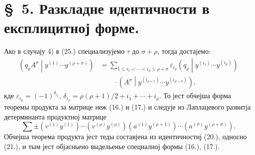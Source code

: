 ﻿\documentclass[11pt]{article}
\newcommand{\pair}[2]{\left(#1\middle|#2\right)}
\newcommand{\eps}{\varepsilon}
\begin{document}
\section*{\S\ 5. Разкладне идентичности в експлицитној форме.}

Ако в случају 4) в (25.) специализујемо $\tau$ до $\sigma+\rho$, тогда достајемо:
\begin{equation}
\begin{aligned}
 \pair{q_\rho A^\sigma}{y^{(1)}\cdots y^{(\rho+\sigma)}}
 &=\sum_{1\le i_1<\cdots<i_\rho\le \rho+\sigma}
 \eps_{i_\rho}\pair{q_\rho}{y^{(i_1)}\cdots y^{(i_\rho)}}\\
 &\qquad\cdot
 \pair{A^\sigma}{y^{(i_{\rho+1})}\cdots y^{(i_{\rho+\sigma})}},
\end{aligned}
\tag{32}
\end{equation}
кде $\eps_{i_\rho}=(-1)^{\delta_{i_\rho}}$, $\delta_{i_\rho}=\rho(\rho+1)/2+i_1+\cdots+i_\rho$. То јест обчејша форма теоремы продукта за матрице неж (16.) и (17.) и следује из Лаплацевого развитја детерминанта продуктној матрице
\[
 \sum\pm(v^{(1)}y^{(1)})\cdots(v^{(\rho)}y^{(\rho)})
 (a^{(1)}y^{(\rho+1)})\cdots(a^{(\sigma)}y^{(\rho+\sigma)}).
\]
Обчејша теорема продукта јест теды составјена из идентичностиј (20.), односно (21.), и тым јест објасньено выдельенье специалној формы (16.), (17.).
\end{document}
